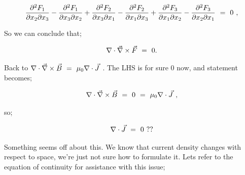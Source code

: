\documentclass{article}
\begin{document}
\begin{equation} \label{eq:51}
\frac{\partial^{2}{F_1}}{\partial{x_2} \partial{x_3}} - \frac{\partial^{2}{F_1}}{\partial{x_3} \partial{x_2}} + \frac{\partial^{2}{F_2}}{\partial{x_3} \partial{x_1}} -  \frac{\partial^{2}{F_2}}{\partial{x_1} \partial{x_3}} + \frac{\partial^{2}{F_3}}{\partial{x_1} \partial{x_2}} - \frac{\partial^{2}{F_3}}{\partial{x_2} \partial{x_1}} \hspace{0.125cm} = \hspace{0.125cm} 0 \hspace{0.125cm} ,
\end{equation}

So we can conclude that;

\begin{equation} \label{eq:51}
\nabla\cdot\vec{\nabla} \times \vec{F} \hspace{0.125cm} = \hspace{0.125cm} 0 .
\end{equation}

Back to \begin{math} \nabla\cdot\vec{\nabla} \times \vec{B} \hspace{0.125cm} = \hspace{0.125cm} \mu_{0} \nabla\cdot\vec{J} \hspace{0.125cm} \end{math}. The LHS is for sure \begin{math} 0 \end{math} now, and statement becomes;

\begin{equation} \label{eq:51}
\nabla\cdot\vec{\nabla} \times \vec{B} \hspace{0.125cm} =  \hspace{0.125cm} 0 \hspace{0.125cm} = \hspace{0.125cm} \mu_{0} \nabla\cdot\vec{J} \hspace{0.125cm} ,
\end{equation}

so;

\begin{equation} \label{eq:51}
\nabla\cdot\vec{J} \hspace{0.125cm} = \hspace{0.125cm} 0 \hspace{0.125cm} ??
\end{equation}

Something seems off about this. We know that current density changes with respect to space, we're just not sure how to formulate it. Lets refer to the equation of continuity for assistance with this issue;
\end{document}
